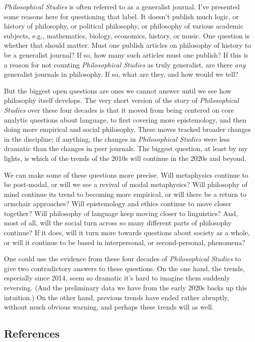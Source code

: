 \documentclass[
  10pt,
  letterpaper,
  DIV=11,
  numbers=noendperiod,
  twoside]{scrartcl}
\begin{document}
\emph{Philosophical Studies} is often referred to as a generalist
journal. I've presented some reasons here for questioning that label. It
doesn't publish much logic, or history of philosophy, or political
philosophy, or philosophy of various academic subjects, e.g.,
mathematics, biology, economics, history, or music. One question is
whether that should matter. Must one publish articles on philosophy of
history to be a generalist journal? If so, how many such articles must
one publish? If this is a reason for not counting \emph{Philosophical
Studies} as truly generalist, are there \emph{any} generalist journals
in philosophy. If so, what are they, and how would we tell?

But the biggest open questions are ones we cannot answer until we see
how philosophy itself develops. The very short version of the story of
\emph{Philosophical Studies} over these four decades is that it moved
from being centered on core analytic questions about language, to first
covering more epistemology, and then doing more empirical and social
philosophy. These moves tracked broader changes in the discipline; if
anything, the changes in \emph{Philosophical Studies} were less dramatic
than the changes in peer journals. The biggest question, at least by my
lights, is which of the trends of the 2010s will continue in the 2020s
and beyond.

We can make some of these questions more precise. Will metaphysics
continue to be post-modal, or will we see a revival of modal
metaphysics? Will philosophy of mind continue its trend to becoming more
empirical, or will there be a return to armchair approaches? Will
epistemology and ethics continue to move closer together? Will
philosophy of language keep moving closer to linguistics? And, most of
all, will the social turn across so many different parts of philosophy
continue? If it does, will it turn more towards questions about society
as a whole, or will it continue to be based in interpersonal, or
second-personal, phenomena?

One could use the evidence from these four decades of
\emph{Philosophical Studies} to give two contradictory answers to these
questions. On the one hand, the trends, especially since 2014, seem so
dramatic it's hard to imagine them suddenly reversing. (And the
preliminary data we have from the early 2020s backs up this intuition.)
On the other hand, previous trends have ended rather abruptly, without
much obvious warning, and perhaps these trends will as well.

\subsection*{References}\label{references}
\end{document}

